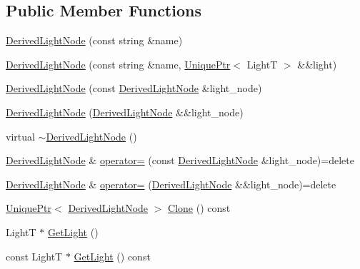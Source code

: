 \subsection*{Public Member Functions}
\begin{DoxyCompactItemize}
\item 
\hyperlink{classmage_1_1_derived_light_node_adfbc8827ef96abbf17a73f070d4be4b6}{Derived\+Light\+Node} (const string \&name)
\item 
\hyperlink{classmage_1_1_derived_light_node_ab3e68ce3299581459843e8ad12f18464}{Derived\+Light\+Node} (const string \&name, \hyperlink{namespacemage_a8c307fbcc33bce9b7f2aa4c26c3b95cf}{Unique\+Ptr}$<$ LightT $>$ \&\&light)
\item 
\hyperlink{classmage_1_1_derived_light_node_a719b8fe088b93a7ecfb6d21b99cc170b}{Derived\+Light\+Node} (const \hyperlink{classmage_1_1_derived_light_node}{Derived\+Light\+Node} \&light\+\_\+node)
\item 
\hyperlink{classmage_1_1_derived_light_node_af99017273f3f8bedcbd3842c31e4ecc4}{Derived\+Light\+Node} (\hyperlink{classmage_1_1_derived_light_node}{Derived\+Light\+Node} \&\&light\+\_\+node)
\item 
virtual \hyperlink{classmage_1_1_derived_light_node_ad4b2371e323d30eda05744237d4dc4eb}{$\sim$\+Derived\+Light\+Node} ()
\item 
\hyperlink{classmage_1_1_derived_light_node}{Derived\+Light\+Node} \& \hyperlink{classmage_1_1_derived_light_node_ad4a81ae2a671d6c278c74dead4660949}{operator=} (const \hyperlink{classmage_1_1_derived_light_node}{Derived\+Light\+Node} \&light\+\_\+node)=delete
\item 
\hyperlink{classmage_1_1_derived_light_node}{Derived\+Light\+Node} \& \hyperlink{classmage_1_1_derived_light_node_a7eabbc97578958f97a7ec11728364eec}{operator=} (\hyperlink{classmage_1_1_derived_light_node}{Derived\+Light\+Node} \&\&light\+\_\+node)=delete
\item 
\hyperlink{namespacemage_a8c307fbcc33bce9b7f2aa4c26c3b95cf}{Unique\+Ptr}$<$ \hyperlink{classmage_1_1_derived_light_node}{Derived\+Light\+Node} $>$ \hyperlink{classmage_1_1_derived_light_node_a38fcbc8d5204f92d0dfd87c1c6d10281}{Clone} () const
\item 
LightT $\ast$ \hyperlink{classmage_1_1_derived_light_node_ac4b4f6985aac0e00238ee7aac8cf06e3}{Get\+Light} ()
\item 
const LightT $\ast$ \hyperlink{classmage_1_1_derived_light_node_ae493c9343e06b5bfe8f74d7cdb79c697}{Get\+Light} () const
\end{DoxyCompactItemize}
